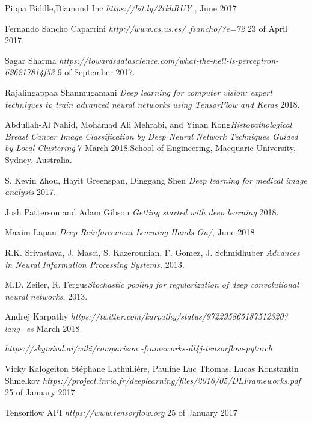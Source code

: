 \documentclass[titlepage,openright,twoside,a4paper,final,12pt,spanish]{book}
\begin{document}
\begin{thebibliography}{9}

 Pippa Biddle,Diamond Inc {\em https://bit.ly/2rkhRUY }, June 2017

   Fernando Sancho Caparrini {\em http://www.cs.us.es/~fsancho/?e=72}  23 of April 2017.

   Sagar Sharma {\em https://towardsdatascience.com/what-the-hell-is-perceptron-626217814f53} 9 of September 2017.

   Rajalingappaa Shanmugamani {\em Deep learning for computer vision: expert techniques to train advanced neural networks using TensorFlow and Keras} 2018.

   Abdullah-Al Nahid, Mohamad Ali Mehrabi, and Yinan Kong{\em Histopathological Breast Cancer Image Classification by Deep Neural Network Techniques Guided by Local Clustering} 7 March 2018.School of Engineering, Macquarie University, Sydney, Australia.

   S. Kevin Zhou, Hayit Greenspan, Dinggang Shen
{\em Deep learning for medical image analysis} 2017.

   Josh Patterson and Adam Gibson
{\em Getting started with deep learning } 2018.

 Maxim Lapan {\em Deep Reinforcement Learning Hands-On/}, June 2018

   R.K. Srivastava, J. Masci, S. Kazerounian, F. Gomez, J. Schmidhuber {\em Advances in Neural Information Processing Systems. } 2013.

   M.D. Zeiler, R. Fergus{\em Stochastic pooling for regularization of deep convolutional neural networks. } 2013.

   Andrej Karpathy {\em 
https://twitter.com/karpathy/status/972295865187512320?lang=es} March 2018

   {\em https://skymind.ai/wiki/comparison -frameworks-dl4j-tensorflow-pytorch}

   Vicky Kalogeiton Stéphane
Lathuilière, Pauline Luc Thomas, Lucas Konstantin Shmelkov
{\em https://project.inria.fr/deeplearning/files/2016/05/DLFrameworks.pdf} 25 of January 2017

  Tensorflow API
{\em https://www.tensorflow.org} 25 of January 2017


\end{thebibliography}
\end{document}
